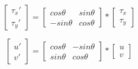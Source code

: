 \documentclass{article}
\begin{document}
\[
 \begin{bmatrix}
 \tau_x' \\
 \tau_y'
 \end{bmatrix} =
 \begin{bmatrix}
  cos \theta   & sin \theta \\
  -sin \theta  & cos \theta
 \end{bmatrix} *
 \begin{bmatrix}
 \tau_x \\
 \tau_y
 \end{bmatrix}
 \]
\pagebreak

\[
 \begin{bmatrix}
 u' \\
 v'
 \end{bmatrix} =
 \begin{bmatrix}
  cos \theta   & -sin \theta \\
  sin \theta  & cos \theta
 \end{bmatrix} *
 \begin{bmatrix}
 u \\
 v
 \end{bmatrix}
 \]
\pagebreak
\end{document}
